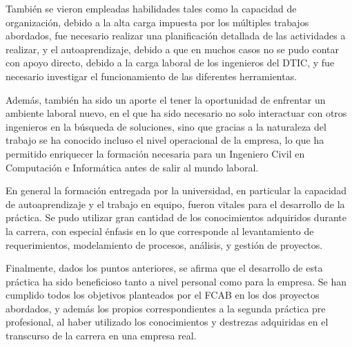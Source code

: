 \documentclass[oneside,12pt, letterpaper, titlepage]{book}
\begin{document}
También se vieron empleadas habilidades tales como la capacidad de organización, debido a la alta carga impuesta por los múltiples trabajos abordados, fue necesario realizar una planificación detallada de las actividades a realizar, y el autoaprendizaje, debido a que en muchos casos no se pudo contar con apoyo directo, debido a la carga laboral de los ingenieros del DTIC, y fue necesario investigar el funcionamiento de las diferentes herramientas.

Además, también ha sido un aporte el tener la oportunidad de enfrentar un ambiente laboral nuevo, en el que ha sido necesario no solo interactuar con otros ingenieros en la búsqueda de soluciones, sino que gracias a la naturaleza del trabajo se ha conocido incluso el nivel operacional de la empresa, lo que ha permitido enriquecer la formación necesaria para un Ingeniero Civil en Computación e Informática antes de salir al mundo laboral.

En general la formación entregada por la universidad, en particular la capacidad de autoaprendizaje y el trabajo en equipo, fueron vitales para el desarrollo de la práctica. Se pudo utilizar gran cantidad de los conocimientos adquiridos durante la carrera, con especial énfasis en lo que corresponde al levantamiento de requerimientos,  modelamiento de procesos, análisis, y gestión de proyectos.

Finalmente, dados los puntos anteriores, se afirma que el desarrollo de esta práctica ha sido beneficioso tanto a nivel personal como para la empresa. Se han cumplido todos los objetivos planteados por el FCAB en los dos proyectos abordados, y además los propios correspondientes a la segunda práctica pre profesional, al haber utilizado los conocimientos y destrezas adquiridas en el transcurso de la carrera en una empresa real.

\renewcommand\bibname{BIBLIOGRAFÍA}

\end{document}

